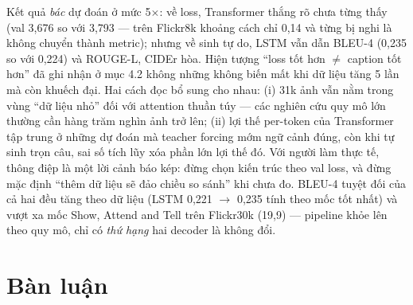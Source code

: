 Kết quả \emph{bác} dự đoán ở mức 5$\times$: về loss, Transformer thắng rõ chưa
từng thấy (val 3,676 so với 3,793 --- trên Flickr8k khoảng cách chỉ 0,14 và
từng bị nghi là không chuyển thành metric); nhưng về sinh tự do, LSTM vẫn dẫn
BLEU-4 (0,235 so với 0,224) và ROUGE-L, CIDEr hòa. Hiện tượng ``loss tốt hơn
$\ne$ caption tốt hơn'' đã ghi nhận ở mục 4.2 không những không biến mất khi
dữ liệu tăng 5 lần mà còn khuếch đại. Hai cách đọc bổ sung cho nhau: (i) 31k
ảnh vẫn nằm trong vùng ``dữ liệu nhỏ'' đối với attention thuần túy --- các
nghiên cứu quy mô lớn thường cần hàng trăm nghìn ảnh trở lên; (ii) lợi thế
per-token của Transformer tập trung ở những dự đoán mà teacher forcing mớm ngữ
cảnh đúng, còn khi tự sinh trọn câu, sai số tích lũy xóa phần lớn lợi thế đó.
Với người làm thực tế, thông điệp là một lời cảnh báo kép: đừng chọn kiến trúc
theo val loss, và đừng mặc định ``thêm dữ liệu sẽ đảo chiều so sánh'' khi chưa
đo. BLEU-4 tuyệt đối của cả hai đều tăng theo dữ liệu (LSTM 0,221 $\to$ 0,235
tính theo mốc tốt nhất) và vượt xa mốc Show, Attend and Tell trên Flickr30k
(19,9) --- pipeline khỏe lên theo quy mô, chỉ có \emph{thứ hạng} hai decoder
là không đổi.

\section{Bàn luận}

